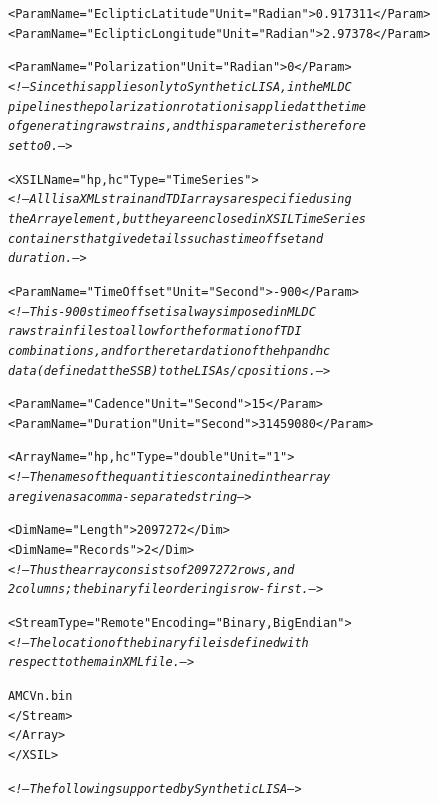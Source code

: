 \documentclass[11pt]{report}
\begin{document}
\begin{alltt}
            <Param Name="EclipticLatitude" Unit="Radian">0.917311</Param>
            <Param Name="EclipticLongitude" Unit="Radian">2.97378</Param>
            
            <Param Name="Polarization" Unit="Radian">0</Param>
            \textsl{<!-- Since this applies only to Synthetic LISA, in the MLDC
                 pipelines the polarization rotation is applied at the time
                 of generating raw strains, and this parameter is therefore
                 set to 0. -->}

            <XSIL Name="hp,hc" Type="TimeSeries">
                \textsl{<!-- All lisaXML strain and TDI arrays are specified using
                     the Array element, but they are enclosed in XSIL TimeSeries
                     containers that give details such as time offset and
                     duration. -->}

                <Param Name="TimeOffset" Unit="Second">-900</Param>
                \textsl{<!-- This -900 s time offset is always imposed in MLDC
                     raw strain files to allow for the formation of TDI
                     combinations, and for the retardation of the hp and hc
                     data (defined at the SSB) to the LISA s/c positions. -->}
                         
                <Param Name="Cadence" Unit="Second">15</Param>
                <Param Name="Duration" Unit="Second">31459080</Param>

                <Array Name="hp,hc" Type="double" Unit="1">
                    \textsl{<!-- The names of the quantities contained in the array
                        are given as a comma-separated string -->}

                    <Dim Name="Length">2097272</Dim>
                    <Dim Name="Records">2</Dim>
                    \textsl{<!-- Thus the array consists of 2097272 rows, and
                         2 columns; the binary file ordering is row-first. -->}

                    <Stream Type="Remote" Encoding="Binary,BigEndian">
                        \textsl{<!-- The location of the binary file is defined with
                             respect to the main XML file. -->}
                                                 
                        AMCVn.bin
                    </Stream>
                </Array>
            </XSIL>

            \textsl{<!-- The following supported by Synthetic LISA -->}


\end{alltt}
\end{document}
